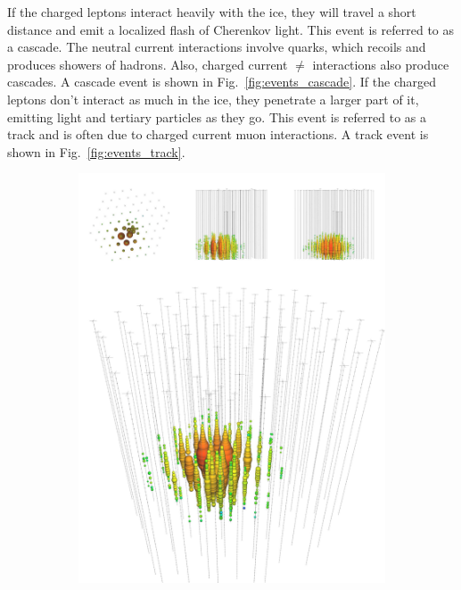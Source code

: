 If the charged leptons interact heavily with the ice, they will travel a short distance and emit a localized flash of 
Cherenkov light. This event is referred to as a cascade. The neutral current interactions involve quarks, which recoils and produces
showers of hadrons. Also, charged current $\ne$ interactions also produce cascades. A cascade event 
is shown in Fig.~\ref{fig:events_cascade}.
If the charged leptons don't interact as much in the ice, they penetrate a larger part of it, emitting light and tertiary particles
as they go. This event is referred to as a track and is often due to charged current muon interactions. A track event 
is shown in Fig.~\ref{fig:events_track}. 

\begin{figure}\label{fig:events}
    \begin{center}
        \begin{subfigure}{0.4\textwidth}
            \centering
            \includegraphics[clip, trim=0cm 0cm 0cm 30cm, width=1\textwidth]{figures/cascade_event.pdf}

\end{subfigure}
\end{center}
\end{figure}
